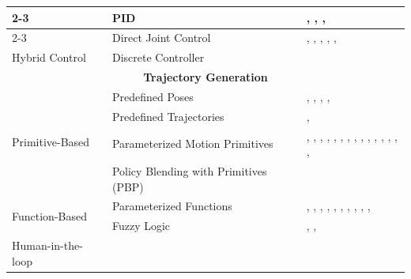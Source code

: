 \begin{table}[!h]
\begin{tabular}{|p{4cm}|p{5cm}|p{15cm}|}
\cline{2-3}
    & PID                                                  & \cite{Groth2013MultitaskingOC}, \cite{Waarsing2003BehaviorbasedMM}, \cite{Waarsing2005FromBI}, \cite{Williams2012ARA} \\
\cline{2-3}
    & Direct Joint Control                                 & \cite{Koch2017ASR}, \cite{Stckler2014AdaptiveTS}, \cite{Forster2020AutomaticEO}, \cite{Scholz2011CartPW}, \cite{Waarsing2001IntroducingRI}, \cite{Mounsif2020BAMBA} \\
\hline
Hybrid Control     & Discrete Controller                    & \cite{Vasilopoulos2020ReactivePF} \\
\hline
\multicolumn{3}{|c|}{\textbf{Trajectory Generation}} \\
\hline
\multirow{4}{*}{\parbox{3cm}{Primitive-Based}}
    & Predefined Poses                      & \cite{Holz2015ASS}, \cite{Arrais2019ApplicationOT}, \cite{Pedersen2016RobotSF}, \cite{Lim2019SkillbasedAA}, \cite{Chang2006ABB} \\
\cline{2-3}
    & Predefined Trajectories               & \cite{Nagatani1996DesigningSA}, \cite{Nagatani1996DooropeningBO} \\
\cline{2-3}
    & Parameterized Motion Primitives       & \cite{Stckler2014AdaptiveTS}, \cite{Garrett2016FFRobLS}, \cite{Yamazaki2012HomeAssistantRF}, \cite{Schwarz2016HybridDL}, \cite{Stckler2009IntegratingIM}, \cite{Andersen2017IntegrationOA}, \cite{Rodehutskors2015IntuitiveBT}, \cite{Pohl2024MAkEableMA}, \cite{Settimi2016MotionPB}, \cite{Groth2013MultitaskingOC}, \cite{Hornung2012NavigationIT}, \cite{Beetz2016OpenRR}, \cite{Partovi2017ReactiveIM}, \cite{Stuckler2012RoboCupHomeDE}, \cite{Petersson1999AHC}, \cite{Aarno2008MotionIR} \\
\cline{2-3}
    & Policy Blending with Primitives (PBP) & \cite{Maeda2022BlendingPP} \\
\hline
\multirow{2}{*}{\parbox{3cm}{Function-Based}}
    & Parameterized Functions               & \cite{Forster2020AutomaticEO}, \cite{Weser2009AutonomousPF}, \cite{Bruemmer2010BehaviorBC}, \cite{Li2022BEHAVIOR1KAB}, \cite{Sayyaadi2014ControlON}, \cite{Pedersen2015GestureBasedEO}, \cite{Frasca2020GoingCA}, \cite{Yamazaki2012HomeAssistantRF}, \cite{Stckler2013IncreasingFO}, \cite{Rodehutskors2015IntuitiveBT}, \cite{Amaral2017SkillbasedAA} \\
\cline{2-3}
    & Fuzzy Logic                           & \cite{Tsay2018BehavioristicIP}, \cite{Lin2010ResearchOO}, \cite{Wasik2002AFB} \\
\hline
\multirow{1}{*}{\parbox{3cm}{Human-in-the-loop}}

\end{tabular}
\end{table}
